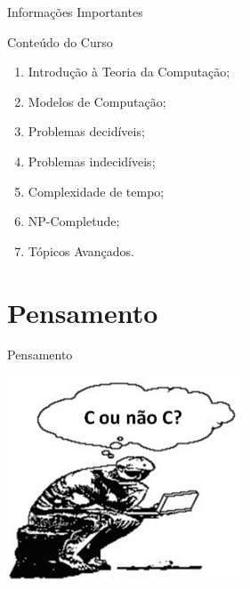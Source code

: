 \documentclass[xcolor=dvipsnames,table]{beamer}
\begin{document}
	\begin{frame}{Informações Importantes}
		\begin{block}{Conteúdo do Curso}
			\begin{enumerate}
				\item Introdução à Teoria da Computação;
				\item Modelos de Computação;
				\item Problemas decidíveis;
				\item Problemas indecidíveis;
				\item Complexidade de tempo;
				\item NP-Completude;
				\item Tópicos Avançados.
			\end{enumerate}
		\end{block}
	\end{frame}

	\section{Pensamento}
	\begin{frame}{Pensamento}
  		\begin{center}
    		\includegraphics[width=7cm]{images/pensamento.png}
  		\end{center}
	\end{frame}
	
\end{document}
